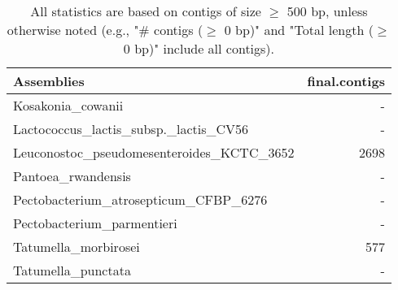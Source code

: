 \documentclass[12pt,a4paper]{article}
\begin{document}
\begin{table}[ht]
\begin{center}
\caption{All statistics are based on contigs of size $\geq$ 500 bp, unless otherwise noted (e.g., "\# contigs ($\geq$ 0 bp)" and "Total length ($\geq$ 0 bp)" include all contigs).}
\begin{tabular}{|l*{1}{|r}|}
\hline
Assemblies & final.contigs \\ \hline
Kosakonia\_cowanii & - \\ \hline
Lactococcus\_lactis\_subsp.\_lactis\_CV56 & - \\ \hline
Leuconostoc\_pseudomesenteroides\_KCTC\_3652 & 2698 \\ \hline
Pantoea\_rwandensis & - \\ \hline
Pectobacterium\_atrosepticum\_CFBP\_6276 & - \\ \hline
Pectobacterium\_parmentieri & - \\ \hline
Tatumella\_morbirosei & 577 \\ \hline
Tatumella\_punctata & - \\ \hline
\end{tabular}
\end{center}
\end{table}
\end{document}
